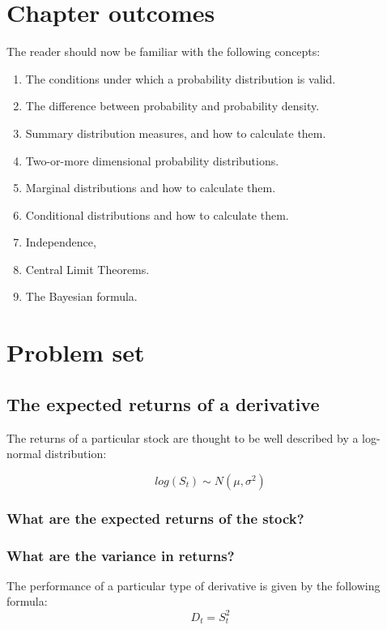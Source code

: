 \documentclass[11pt,fullpage]{book}
\begin{document}
\section{Chapter outcomes}
The reader should now be familiar with the following concepts:
\begin{enumerate}
\item The conditions under which a probability distribution is valid.
\item The difference between probability and probability density.
\item Summary distribution measures, and how to calculate them.
\item Two-or-more dimensional probability distributions.
\item Marginal distributions and how to calculate them.
\item Conditional distributions and how to calculate them.
\item Independence,
\item Central Limit Theorems.
\item The Bayesian formula.
\end{enumerate}

\section{Problem set}
\subsection{The expected returns of a derivative}
The returns of a particular stock are thought to be well described by a log-normal distribution:

\begin{equation}
log(S_t) \sim N(\mu,\sigma^2)
\end{equation}

\subsubsection{What are the expected returns of the stock?}
\subsubsection{What are the variance in returns?}

The performance of a particular type of derivative is given by the following formula:
\begin{equation}
D_t = S_t^2
\end{equation}
\end{document}
